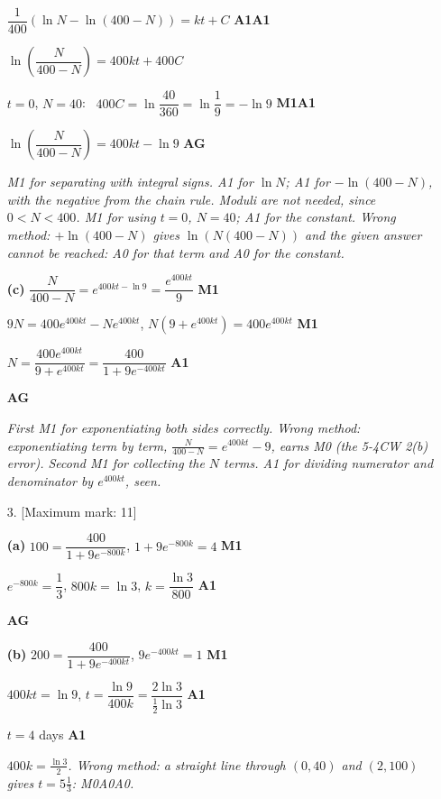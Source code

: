 \documentclass[12pt, twoside]{article}
\begin{document}
\begin{enumerate}[itemsep=0.3cm]
$\dfrac{1}{400}\left(\ln N - \ln(400 - N)\right) = kt + C$ \hfill \textbf{A1A1}

$\ln\left(\dfrac{N}{400 - N}\right) = 400kt + 400C$

$t = 0$, $N = 40$: \ $400C = \ln\dfrac{40}{360} = \ln\dfrac{1}{9} = -\ln 9$ \hfill \textbf{M1A1}

$\ln\left(\dfrac{N}{400 - N}\right) = 400kt - \ln 9$ \hfill \textbf{AG}

\emph{M1 for separating with integral signs. A1 for $\ln N$; A1 for
$-\ln(400 - N)$, with the negative from the chain rule. Moduli are not
needed, since $0 < N < 400$. M1 for using $t = 0$, $N = 40$; A1 for the
constant. Wrong method: $+\ln(400 - N)$ gives
$\ln\left(N(400 - N)\right)$ and the given answer cannot be reached: A0 for
that term and A0 for the constant.}

\textbf{(c)} $\dfrac{N}{400 - N} = e^{400kt - \ln 9} = \dfrac{e^{400kt}}{9}$
\hfill \textbf{M1}

$9N = 400e^{400kt} - Ne^{400kt}$, \quad $N\left(9 + e^{400kt}\right) = 400e^{400kt}$
\hfill \textbf{M1}

$N = \dfrac{400e^{400kt}}{9 + e^{400kt}} = \dfrac{400}{1 + 9e^{-400kt}}$
\hfill \textbf{A1}

\hfill \textbf{AG}

\emph{First M1 for exponentiating both sides correctly. Wrong method:
exponentiating term by term, $\frac{N}{400 - N} = e^{400kt} - 9$, earns M0
(the 5-4CW 2(b) error). Second M1 for collecting the $N$ terms. A1 for
dividing numerator and denominator by $e^{400kt}$, seen.}

\newpage

\item[3.] [Maximum mark: 11]

\textbf{(a)} $100 = \dfrac{400}{1 + 9e^{-800k}}$, \quad $1 + 9e^{-800k} = 4$
\hfill \textbf{M1}

$e^{-800k} = \dfrac{1}{3}$, \quad $800k = \ln 3$, \quad $k = \dfrac{\ln 3}{800}$
\hfill \textbf{A1}

\hfill \textbf{AG}

\textbf{(b)} $200 = \dfrac{400}{1 + 9e^{-400kt}}$, \quad $9e^{-400kt} = 1$
\hfill \textbf{M1}

$400kt = \ln 9$, \quad $t = \dfrac{\ln 9}{400k} = \dfrac{2\ln 3}{\frac{1}{2}\ln 3}$
\hfill \textbf{A1}

$t = 4$ days \hfill \textbf{A1}

\emph{$400k = \frac{\ln 3}{2}$. Wrong method: a straight line through
$(0, 40)$ and $(2, 100)$ gives $t = 5\frac{1}{3}$: M0A0A0.}


\end{enumerate}
\end{document}
